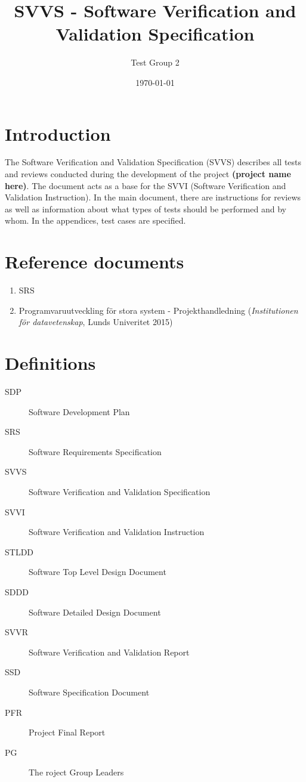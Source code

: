 \documentclass[a4paper]{article}
\title{SVVS - Software Verification and Validation Specification}
\date{\today}
\author{Test Group 2}
\begin{document}
\maketitle


\pagebreak
\setcounter{tocdepth}{2}
\tableofcontents
\pagebreak



\section{Introduction}
The Software Verification and Validation Specification (SVVS) describes all tests and reviews conducted during the development of the project \textbf{(project name here)}. The document acts as a base for the SVVI (Software Verification and Validation Instruction).
In the main document, there are instructions for reviews as well as information about what types of tests should be performed and by whom. In the appendices, test cases are specified.

\section{Reference documents}
\begin{enumerate}
\item SRS \label{refdocs:srs}
\item Programvaruutveckling för stora system - Projekthandledning (\textit{Institutionen för datavetenskap}, Lunds Univeritet 2015) \label{refdocs:projekthandledning}
\end{enumerate}

\section{Definitions}
\begin{description}
\item[SDP] Software Development Plan
\item[SRS] Software Requirements Specification
\item[SVVS] Software Verification and Validation Specification
\item[SVVI] Software Verification and Validation Instruction
\item[STLDD] Software Top Level Design Document
\item[SDDD] Software Detailed Design Document
\item[SVVR] Software Verification and Validation Report
\item[SSD] Software Specification Document
\item[PFR] Project Final Report
\item[PG] The roject Group Leaders
\end{description}
\end{document}
